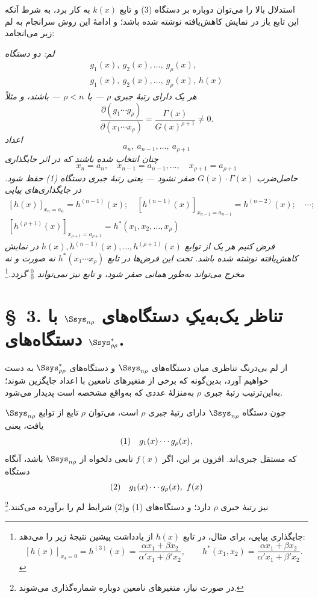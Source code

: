 \documentclass[11pt]{article}
\newcommand{\srcLTR}[1]{\relax\ifmmode\text{\mbox{\babelsublr{\foreignlanguage{english}{#1}}}}\else\babelsublr{\foreignlanguage{english}{#1}}\fi}
\newcommand{\srcfn}[2]{\begingroup\renewcommand{\thefootnote}{\srcLTR{#1}}\footnote{#2}\addtocounter{footnote}{-1}\endgroup}
\begin{document}
استدلال بالا را می‌توان دوباره بر دستگاه (3) و تابع $k(x)$ به کار برد، به شرط آنکه این تابع باز در نمایش کاهش‌یافته نوشته شده باشد؛ و ادامهٔ این روش سرانجام به لم زیر می‌انجامد:

\emph{لم: دو دستگاه}
\[
\begin{array}{c}
g_1(x),\ g_2(x),\ldots,\ g_\rho(x),\\
g_1(x),\ g_2(x),\ldots,\ g_\rho(x),\ h(x)
\end{array}
\]
\emph{هر یک دارای رتبهٔ جبری $\rho$ --- با $\rho<n$ --- باشند، و مثلاً}
\[
 \frac{\partial(g_1\cdots g_\rho)}
 {\partial(x_1\cdots x_\rho)}
 =\frac{\Gamma(x)}{G(x)^{\rho+1}}\ne0.
\]
\emph{اعداد}
\[
 a_n,\ a_{n-1},\ldots,\ a_{\rho+1}
\]
\emph{چنان انتخاب شده باشند که در اثر جایگذاری}
\[
 x_n=a_n,\quad x_{n-1}=a_{n-1},\ldots,\quad x_{\rho+1}=a_{\rho+1}
\]
\emph{حاصل‌ضرب $G(x)\cdot\Gamma(x)$ صفر نشود --- یعنی رتبهٔ جبری دستگاه (1) حفظ شود. در جایگذاری‌های پیاپی}
\[
\begin{array}{c}
[h(x)]_{x_n=a_n}=h^{(n-1)}(x);\quad
[h^{(n-1)}(x)]_{x_{n-1}=a_{n-1}}=h^{(n-2)}(x);\quad\cdots;\\[0.25em]
[h^{(\rho+1)}(x)]_{x_{\rho+1}=a_{\rho+1}}=h^*(x_1,x_2,\ldots,x_\rho)
\end{array}
\]
\emph{فرض کنیم هر یک از توابع $h(x),h^{(n-1)}(x),\ldots,h^{(\rho+1)}(x)$ در نمایش کاهش‌یافته نوشته شده باشد. تحت این فرض‌ها در تابع $h^*(x_1\cdots x_\rho)$ نه صورت و نه مخرج می‌تواند به‌طور همانی صفر شود، و تابع نیز نمی‌تواند $\frac00$ گردد.}\srcfn{**)}{جایگذاری پیاپی، برای مثال، در تابع $h(x)$ از یادداشت پیشین نتیجهٔ زیر را می‌دهد:
\[
 [h(x)]_{x_4=0}=h^{(3)}(x)=\frac{\alpha x_1+\beta x_2}{\alpha' x_1+\beta' x_2},\qquad
 h^*(x_1,x_2)=\frac{\alpha x_1+\beta x_2}{\alpha' x_1+\beta' x_2}.
\]}

\section*{\S\ 3. تناظر یک‌به‌یکِ دستگاه‌های $\Ssys_{n\rho}$ با دستگاه‌های $\Ssys^*_{\rho\rho}$.}

از لم بی‌درنگ تناظری میان دستگاه‌های $\Ssys_{n\rho}$ و دستگاه‌های $\Ssys^*_{\rho\rho}$ به دست خواهیم آورد، بدین‌گونه که برخی از متغیرهای نامعین با اعداد جایگزین شوند؛ به‌این‌ترتیب رتبهٔ جبری $\rho$ به‌منزلهٔ عددی که به‌واقع مشخصه است پدیدار می‌شود.

چون دستگاه $\Ssys_{n\rho}$ دارای رتبهٔ جبری $\rho$ است، می‌توان $\rho$ تابع از توابع $\Ssys_{n\rho}$ یافت، یعنی
\[
\begin{array}{@{}l@{\quad}c@{}}
(1)& g_1(x)\cdots g_\rho(x),
\end{array}
\]
که مستقل جبری‌اند. افزون بر این، اگر $f(x)$ تابعی دلخواه از $\Ssys_{n\rho}$ باشد، آنگاه دستگاه
\[
\begin{array}{@{}l@{\quad}c@{}}
(2)& g_1(x)\cdots g_\rho(x),\ f(x)
\end{array}
\]
نیز رتبهٔ جبری $\rho$ دارد؛ و دستگاه‌های (1) و(2) شرایط لم را برآورده می‌کنند.\srcfn{*)}{در صورت نیاز، متغیرهای نامعین دوباره شماره‌گذاری می‌شوند.}
\end{document}
